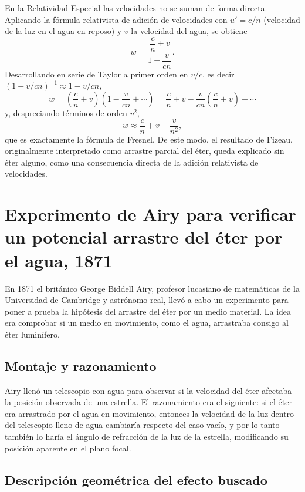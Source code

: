 En la Relatividad Especial las velocidades no se suman de forma directa. Aplicando la fórmula relativista de adición de velocidades con $u'=c/n$ (velocidad de la luz en el agua en reposo) y $v$ la velocidad del agua, se obtiene
$$
w=\frac{\dfrac{c}{n}+v}{1+\dfrac{v}{cn}}.
$$
Desarrollando en serie de Taylor a primer orden en $v/c$, es decir $(1+v/cn)^{-1}\approx 1-v/cn$,
$$
w=\left(\frac{c}{n}+v\right)\left(1-\frac{v}{cn}+\cdots\right)
=\frac{c}{n}+v-\frac{v}{cn}\left(\frac{c}{n}+v\right)+\cdots
$$
y, despreciando términos de orden $v^{2}$,
$$
w\approx \frac{c}{n}+v-\frac{v}{n^{2}},
$$
que es exactamente la fórmula de Fresnel. De este modo, el resultado de Fizeau, originalmente interpretado como arrastre parcial del éter, queda explicado sin éter alguno, como una consecuencia directa de la adición relativista de velocidades.



\section{Experimento de Airy para verificar un potencial arrastre del éter por el agua, 1871}

En 1871 el británico George Biddell Airy, profesor lucasiano de matemáticas de la Universidad de Cambridge y astrónomo real, llevó a cabo un experimento para poner a prueba la hipótesis del arrastre del éter por un medio material. La idea era comprobar si un medio en movimiento, como el agua, arrastraba consigo al éter luminífero.

\subsection{Montaje y razonamiento}

Airy llenó un telescopio con agua para observar si la velocidad del éter afectaba la posición observada de una estrella. El razonamiento era el siguiente: si el éter era arrastrado por el agua en movimiento, entonces la velocidad de la luz dentro del telescopio lleno de agua cambiaría respecto del caso vacío, y por lo tanto también lo haría el ángulo de refracción de la luz de la estrella, modificando su posición aparente en el plano focal.

\subsection{Descripción geométrica del efecto buscado}

